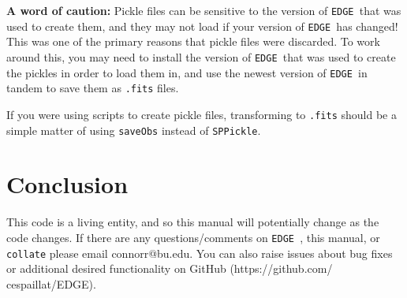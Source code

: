 \documentclass{article}
\newcommand{\edge}{\texttt{EDGE }}
\begin{document}
\noindent  \textbf{A word of caution:} Pickle files can be sensitive to the version of \edge that was used to create them, and they may not load if your version of \edge has changed! This was one of the primary reasons that pickle files were discarded. To work around this, you may need to install the version of \edge that was used to create the pickles in order to load them in, and use the newest version of \edge in tandem to save them as \texttt{.fits} files. 

\noindent If you were using scripts to create pickle files, transforming to \texttt{.fits} should be a simple matter of using \texttt{saveObs} instead of \texttt{SPPickle}.

\section{Conclusion}
 
This code is a living entity, and so this manual will potentially change as the code changes. If there are any questions/comments on \edge, this manual, or \texttt{collate} please email connorr@bu.edu. You can also raise issues about bug fixes or additional desired functionality on GitHub (https://github.com/ cespaillat/EDGE). 
\end{document}
